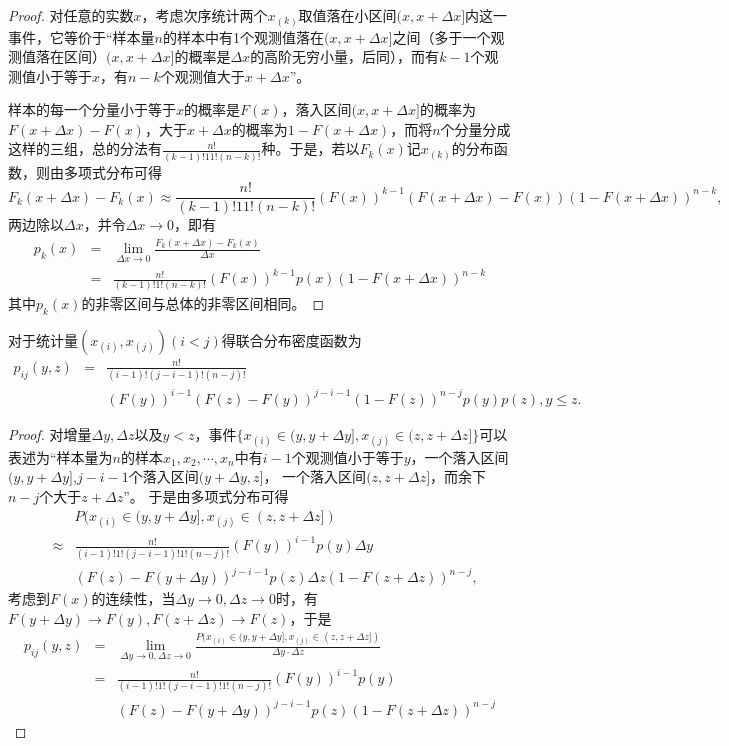 \begin{proof}
    对任意的实数$x$，考虑次序统计两个$x_{(k)}$取值落在小区间$(x,x+\Delta x]$内这一事件，它等价于“样本量$n$的样本中有1个观测值落在$(x,x+\Delta x]$之间（多于一个观测值落在区间）$(x,x+\Delta x]$的概率是$\Delta x$的高阶无穷小量，后同），而有$k-1$个观测值小于等于$x$，有$n-k$个观测值大于$x+\Delta x$”。

    样本的每一个分量小于等于$x$的概率是$F(x)$，落入区间$(x,x+\Delta x]$的概率为$F(x+\Delta x)-F(x)$，大于$x+\Delta x$的概率为$1-F(x+\Delta x)$，而将$n$个分量分成这样的三组，总的分法有$\frac{n!}{(k-1)!11!(n-k)!}$种。于是，若以$F_k(x)$记$x_{(k)}$的分布函数，则由多项式分布可得
    $$
    F_k(x+\Delta x) - F_k(x) \approx \frac{n!}{(k-1)!11!(n-k)!} (F(x))^{k-1} (F(x+\Delta x)-F(x))(1-F(x+\Delta x))^{n-k},
    $$
    两边除以$\Delta x$，并令$\Delta x \rightarrow 0$，即有
    \begin{eqnarray*}
        p_k(x) &=& \lim_{\Delta x \rightarrow 0} \frac{F_k(x+\Delta x) - F_k(x)}{\Delta x}\\
        &=& \frac{n!}{(k-1)!1!(n-k)!} (F(x))^{k-1} p(x)(1-F(x+\Delta x))^{n-k}
    \end{eqnarray*}
    其中$p_k(x)$的非零区间与总体的非零区间相同。
\end{proof}
    
 
\begin{theorem}
    对于统计量$(x_{(i)},x_{(j)})(i<j)$得联合分布密度函数为
    \begin{eqnarray*}
        p_{ij}(y,z) &=& \frac{n!}{(i-1)!(j-i-1)!(n-j)!} \\
        &&(F(y))^{i-1} (F(z)-F(y))^{j-i-1}(1-F(z))^{n-j}p(y)p(z), y\leq z.
    \end{eqnarray*}

\end{theorem}
\begin{proof}
对增量$\Delta y, \Delta z$以及$y<z$，事件$\{x_{(i)} \in (y,y+\Delta y], x_{(j)} \in  (z , z+\Delta z]\}$可以表述为“样本量为$n$的样本$x_1,x_2,\cdots,x_n$中有$i-1$个观测值小于等于$y$，一个落入区间$(y,y+\Delta y]$,$j-i-1$个落入区间$(y+\Delta y, z]$， 一个落入区间$(z,z+\Delta z]$，而余下$n-j$个大于$z+\Delta z$”。
于是由多项式分布可得
\begin{eqnarray*}
    &&P(x_{(i)}\in (y,y+\Delta y] , x_{(j)}\in (z,z+\Delta z]) \\
    &\approx& \frac{n!}{(i-1)!1!(j-i-1)!1!(n-j)!}(F(y))^{i-1} p(y)\Delta y\\
    &&(F(z) - F(y+\Delta y))^{j-i-1} p(z)\Delta z (1-F(z+\Delta z))^{n-j}, 
\end{eqnarray*}
考虑到$F(x)$的连续性，当$\Delta y \rightarrow 0, \Delta z \rightarrow 0$时，有$F(y+\Delta y) \rightarrow F(y),F(z+\Delta z) \rightarrow F(z) $，于是
\begin{eqnarray*}
    p_{ij}(y,z) &=& \lim_{\Delta y \rightarrow 0,\Delta z \rightarrow 0} \frac{P(x_{(i)}\in (y,y+\Delta y] , x_{(j)}\in (z,z+\Delta z])}{\Delta y \cdot \Delta z}\\
    &=& \frac{n!}{(i-1)!1!(j-i-1)!1!(n-j)!}(F(y))^{i-1} p(y) \\
    &&(F(z) - F(y+\Delta y))^{j-i-1} p(z)(1-F(z+\Delta z))^{n-j}
\end{eqnarray*}
\end{proof}

